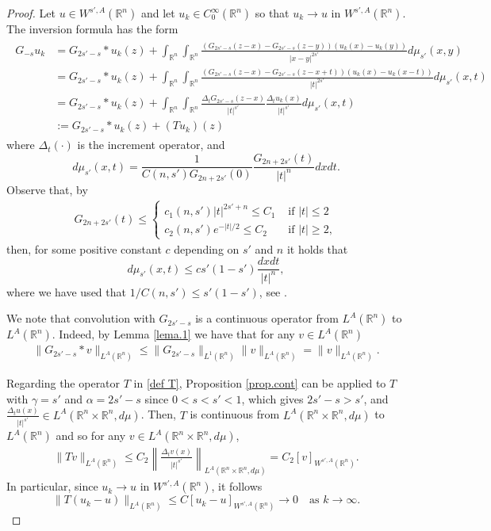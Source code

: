 \documentclass[leqno,twoside, 12pt]{amsart}
\theoremstyle{plain}
\numberwithin{equation}{section} \numberwithin{figure}{section}
\theoremstyle{definition}
\newcommand{\R}{\mathbb R}
\numberwithin{equation}{section}
\begin{document}
 
\begin{proof}
Let $u\in W^{s',A}(\R^n)$ and let $u_k\in C_0^\infty(\R^n)$ so that $u_k\to u$ in $ W^{s',A}(\R^n)$. The inversion formula \cite[formula (5.26)]{AS}  has the form
\begin{align}\label{def T}
\begin{split}
G_{-s}u_k&= G_{2s'-s}*u_k(z) + \int_{\R^n} \int_{\R^n} \frac{(G_{2s'-s}(z-x)-G_{2s'-s}(z-y))(u_k(x)-u_k(y))}{|x-y|^{2s'}}d\mu_{s'}(x,y)\\
&=
G_{2s'-s}*u_k(z) + \int_{\R^n} \int_{\R^n} \frac{(G_{2s'-s}(z-x)-G_{2s'-s}(z-x+t))(u_k(x)-u_k(x-t))}{|t|^{2s'}}d\mu_{s'}(x,t)\\
&=
G_{2s'-s}*u_k(z) + \int_{\R^n} \int_{\R^n} \frac{\Delta_{t}G_{2s'-s}(z-x)}{|t|^{s'}} \frac{\Delta_t u_k(x)}{|t|^{s'}}d\mu_{s'}(x,t)\\
&:=G_{2s'-s}*u_k(z) + (Tu_k)(z)
\end{split}
\end{align}
where $\Delta_t(\cdot)$ is the increment operator, and 
$$
d\mu_{s'}(x,t) = \frac{1}{C(n,s') G_{2n+2s'}(0)} \frac{G_{2n+2s'}(t)}{|t|^n}dxdt.
$$
Observe that, by \cite[Proposition 6.15]{grafakos}
\begin{align}
G_{2n+2s'}(t) \leq 
\begin{cases}
c_1(n,s')|t|^{2s'+n}\leq C_1 &\text{ if }|t|\leq 2\\
c_2(n,s')e^{-|t|/2}\leq C_2 &\text{ if }|t|\geq 2,
\end{cases}
\end{align}
then, for some positive constant $c$ depending on $s'$ and $n$ it holds that
\begin{equation} \label{d.mu}
d\mu_{s'}(x,t) \leq c s'(1-s')\frac{dxdt}{|t|^n},
\end{equation}
where we have used that $1/C(n,s')\leq s'(1-s')$, see \cite[p.274]{AS}.

We note that convolution with  $G_{2s'-s}$ is a continuous operator from  $L^A(\R^n)$ to  $L^A(\R^n)$. Indeed, by Lemma \ref{lema.1} we have that for any $v\in L^A(\R^n)$
\begin{align} \label{ineq1}
\|G_{2s'-s}*v\|_{L^A(\R^n)} \leq \|G_{2s'-s}\|_{L^1(\R^n)}\|v\|_{L^A(\R^n)}=\|v\|_{L^A(\R^n)}.
\end{align}


Regarding the operator $T$ in \eqref{def T}, Proposition \ref{prop.cont} can be applied to $T$  with $\gamma=s'$ and $\alpha=2s'-s$  since $0<s<s'<1$, which gives $2s'-s>s'$, and $\frac{\Delta_t u(x)}{|t|^{s'}} \in L^A(\R^n \times \R^n, d\mu)$. Then, $T$ is continuous from $L^{A}(\R^n \times \R^n, d\mu)$ to $L^A(\R^n)$ and so for any $v\in L^{A}(\R^n \times \R^n, d\mu)$,
\begin{align*}
\|T v\|_{L^A(\R^n)} \leq C_2  \left\| \frac{\Delta_t v(x)}{|t|^{s'}}\right\|_{L^{A}(\R^n \times \R^n, d\mu)}=C_2[v]_{W^{s',A}(\R^n)}.
\end{align*}In particular, since $u_k\to u$ in $W^{s', A}(\R^n)$, it follows
$$\|T (u_k-u)\|_{L^A(\R^n)}\leq C[u_k-u]_{W^{s',A}(\R^n)}\to 0 \quad \text{as }k\to \infty.$$


\end{proof}
\end{document}
